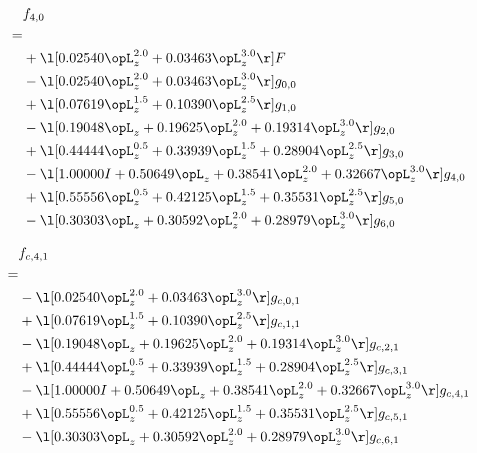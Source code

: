 \begin{alignat}{2} 
\label{eq:f_40_0} 
& f_{4,0} \nonumber \\ 
 = \\ 
& + \l[  0.02540 \opL_z^{2.0} +  0.03463 \opL_z^{3.0}  \r] F \nonumber \\ 
& - \l[  0.02540 \opL_z^{2.0} +  0.03463 \opL_z^{3.0}  \r] g_{0,0} \nonumber \\ 
& + \l[  0.07619 \opL_z^{1.5} +  0.10390 \opL_z^{2.5}  \r] g_{1,0} \nonumber \\ 
& - \l[  0.19048 \opL_z +  0.19625 \opL_z^{2.0} +  0.19314 \opL_z^{3.0}  \r] g_{2,0} \nonumber \\ 
& + \l[  0.44444 \opL_z^{0.5} +  0.33939 \opL_z^{1.5} +  0.28904 \opL_z^{2.5}  \r] g_{3,0} \nonumber \\ 
& - \l[  1.00000 I +  0.50649 \opL_z +  0.38541 \opL_z^{2.0} +  0.32667 \opL_z^{3.0}  \r] g_{4,0} \nonumber \\ 
& + \l[  0.55556 \opL_z^{0.5} +  0.42125 \opL_z^{1.5} +  0.35531 \opL_z^{2.5}  \r] g_{5,0} \nonumber \\ 
& - \l[  0.30303 \opL_z +  0.30592 \opL_z^{2.0} +  0.28979 \opL_z^{3.0}  \r] g_{6,0} \nonumber \\ 
\end{alignat} 


\begin{alignat}{2} 
\label{eq:f_41_0} 
& f_{c,4,1} \nonumber \\ 
 = \\ 
& - \l[  0.02540 \opL_z^{2.0} +  0.03463 \opL_z^{3.0}  \r] g_{c,0,1} \nonumber \\ 
& + \l[  0.07619 \opL_z^{1.5} +  0.10390 \opL_z^{2.5}  \r] g_{c,1,1} \nonumber \\ 
& - \l[  0.19048 \opL_z +  0.19625 \opL_z^{2.0} +  0.19314 \opL_z^{3.0}  \r] g_{c,2,1} \nonumber \\ 
& + \l[  0.44444 \opL_z^{0.5} +  0.33939 \opL_z^{1.5} +  0.28904 \opL_z^{2.5}  \r] g_{c,3,1} \nonumber \\ 
& - \l[  1.00000 I +  0.50649 \opL_z +  0.38541 \opL_z^{2.0} +  0.32667 \opL_z^{3.0}  \r] g_{c,4,1} \nonumber \\ 
& + \l[  0.55556 \opL_z^{0.5} +  0.42125 \opL_z^{1.5} +  0.35531 \opL_z^{2.5}  \r] g_{c,5,1} \nonumber \\ 
& - \l[  0.30303 \opL_z +  0.30592 \opL_z^{2.0} +  0.28979 \opL_z^{3.0}  \r] g_{c,6,1} \nonumber \\ 
\end{alignat} 



